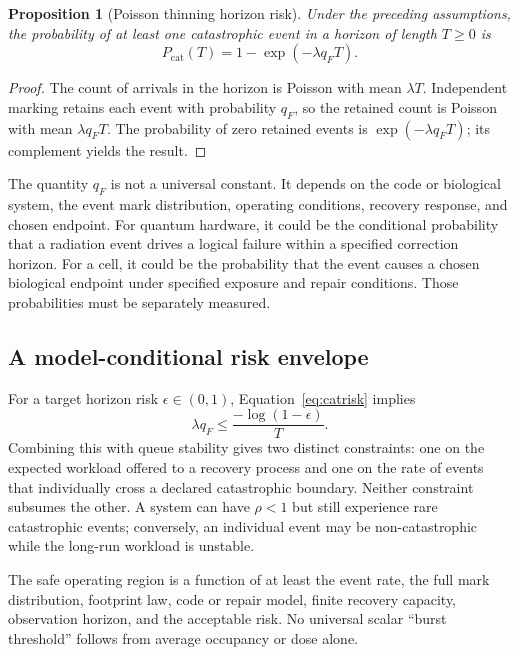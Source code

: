 \documentclass[11pt,a4paper,oneside]{article}
\newtheorem{proposition}{Proposition}[section]
\newenvironment{resultbox}{\begin{tcolorbox}[colback=teal!5,colframe=teal!65!black,boxrule=.8pt,arc=2mm,title=Central result]}{\end{tcolorbox}}
\begin{document}
\begin{proposition}[Poisson thinning horizon risk]\label{prop:thinning}
Under the preceding assumptions, the probability of at least one catastrophic event in a horizon of length \(T\ge0\) is
\begin{equation}\label{eq:catrisk}
P_{\mathrm{cat}}(T)=1-\exp(-\lambda q_F T).
\end{equation}
\end{proposition}
\begin{proof}
The count of arrivals in the horizon is Poisson with mean \(\lambda T\). Independent marking retains each event with probability \(q_F\), so the retained count is Poisson with mean \(\lambda q_F T\). The probability of zero retained events is \(\exp(-\lambda q_F T)\); its complement yields the result.\end{proof}

The quantity \(q_F\) is not a universal constant. It depends on the code or biological system, the event mark distribution, operating conditions, recovery response, and chosen endpoint. For quantum hardware, it could be the conditional probability that a radiation event drives a logical failure within a specified correction horizon. For a cell, it could be the probability that the event causes a chosen biological endpoint under specified exposure and repair conditions. Those probabilities must be separately measured.

\subsection{A model-conditional risk envelope}
For a target horizon risk \(\epsilon\in(0,1)\), Equation~\eqref{eq:catrisk} implies
\begin{equation}\label{eq:risk-envelope}
\lambda q_F \leq \frac{-\log(1-\epsilon)}{T}.
\end{equation}
Combining this with queue stability gives two distinct constraints: one on the expected workload offered to a recovery process and one on the rate of events that individually cross a declared catastrophic boundary. Neither constraint subsumes the other. A system can have \(\rho<1\) but still experience rare catastrophic events; conversely, an individual event may be non-catastrophic while the long-run workload is unstable.

\begin{resultbox}
The safe operating region is a function of at least the event rate, the full mark distribution, footprint law, code or repair model, finite recovery capacity, observation horizon, and the acceptable risk. No universal scalar ``burst threshold'' follows from average occupancy or dose alone.
\end{resultbox}
\end{document}

